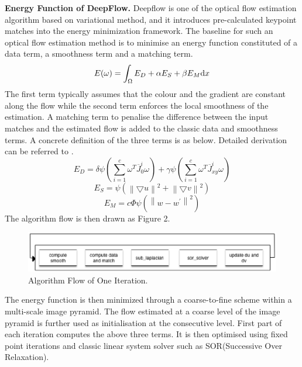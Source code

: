 \documentclass[letterpaper]{article}
\newcommand{\mypar}[1]{{\bf #1.}}
\begin{document}
\mypar{Energy Function of DeepFlow}
Deepflow is one of the optical flow estimation algorithm based on variational method, and it introduces pre-calculated keypoint matches into the energy minimization framework. The baseline for such an optical flow estimation method is to minimise an energy function constituted of a data term, a smoothness term and a matching term. 
\begin{equation}
  E(\omega) = \int_{\Omega}^{} E_{D} + \alpha E_{S} + \beta E_{M} {\rm d}x
\end{equation}
The first term typically assumes that the colour and the gradient are constant along the flow while the second term enforces the local smoothness of the estimation. A matching term to penalise the difference between the input matches and the estimated flow is added to the classic data and smoothness terms. A concrete definition of the three terms is as below. Detailed derivation can be referred to \cite{Weinzaepfel:2013:DLD:2586117.2586991}.
\begin{equation}
  E_{D} = \delta \psi(\sum_{i=1}^{c}\omega ^{T}\overline{J}_{0}^{i}\omega) + \gamma \psi(\sum_{i=1}^{c}\omega ^{T}\overline{J}_{xy}^{i}\omega)
\end{equation}
\begin{equation}
  E_{S} = \psi (\left \| \bigtriangledown u \right \|^{2} + \left \| \bigtriangledown v \right \|^{2})
\end{equation}
\begin{equation}
  E_{M} = c\Phi \psi (\left \| w-w^{'} \right \|^{2})
\end{equation}
The algorithm flow is then drawn as Figure 2.
\begin{figure}[H]\centering
  \includegraphics[scale=0.41]{flow.eps}
  \caption{Algorithm Flow of One Iteration.}
\end{figure}
The energy function is then minimized through a coarse-to-fine scheme within a multi-scale image pyramid. The flow estimated at a coarse level of the image pyramid is further used as initialisation at the consecutive level. First part of each iteration computes the above three terms. It is then optimised using fixed point iterations and classic linear system solver such as SOR(Successive Over Relaxation).
\end{document}
